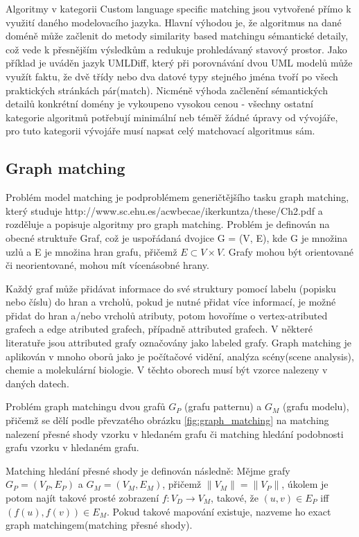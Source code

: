 \documentclass[11pt,twoside,a4paper]{book}
\begin{document}
 Algoritmy v kategorii Custom language specific matching jsou vytvořené
 přímo k využití daného modelovacího jazyka. Hlavní výhodou je, že
 algoritmus na dané doméně může začlenit do metody similarity based matchingu
 sémantické detaily, což vede k přesnějším výsledkům a redukuje prohledávaný 
stavový prostor. Jako příklad je uváděn jazyk UMLDiff, který při porovnávání
dvou UML modelů může využít faktu, že dvě třídy nebo dva datové typy
stejného jména tvoří po všech praktických stránkách pár(match). Nicméně výhoda
začlenění sémantických detailů konkrétní domény je vykoupeno vysokou cenou -
všechny ostatní kategorie algoritmů potřebují minimální neb téměř žádné úpravy
od vývojáře, pro tuto kategorii vývojáře musí napsat celý matchovací algoritmus
sám.

\subsection{Graph matching}
 Problém model matching je podproblémem generičtějšího tasku graph matching,
 který studuje http://www.sc.ehu.es/acwbecae/ikerkuntza/these/Ch2.pdf a
 rozděluje a popisuje algoritmy pro graph matching. Problém je definován na
 obecné struktuře Graf, což je uspořádaná dvojice G = (V, E), kde G je množina
 uzlů a E je množina hran grafu, přičemž $E \subset V \times V$. Grafy mohou být
 orientované či neorientované, mohou mít vícenásobné hrany.
 
 Každý graf může přidávat informace do své struktury pomocí labelu (popisku
 nebo číslu) do hran a vrcholů, pokud je nutné přidat více informací, je možné
 přidat do hran a/nebo vrcholů atributy, potom hovoříme o vertex-atributed
 grafech a edge atributed grafech, případně attributed grafech. V některé
 literatuře jsou attributed grafy označovány jako labeled grafy. Graph
 matching je aplikován v mnoho oborů jako je počítačové vidění, analýza
 scény(scene analysis), chemie a molekulární biologie. V těchto oborech musí být
 vzorce nalezeny v daných datech. 
  
 Problém graph matchingu dvou grafů $G_P$ (grafu patternu) a $G_M$ (grafu
 modelu), přičemž se dělí podle převzatého obrázku \ref{fig:graph_matching} na matching nalezení přesné shody vzorku v hledaném
 grafu či matching hledání podobnosti grafu vzorku v hledaném grafu. 
 
 Matching hledání přesné shody je definován následně: Mějme grafy $G_P = (V_P ,
 E_P)$ a $G_M = (V_M, E_M)$, přičemž $\| V_M\| = \| V_P\|$, úkolem je potom
 najít takové prosté zobrazení  $f: V_D \rightarrow V_M$, takové, že $(u, v) \in
 E_P$ iff $(f(u), f(v)) \in E_M$. Pokud takové mapování existuje, nazveme ho
 exact graph matchingem(matching přesné shody). \\
 
\end{document}
